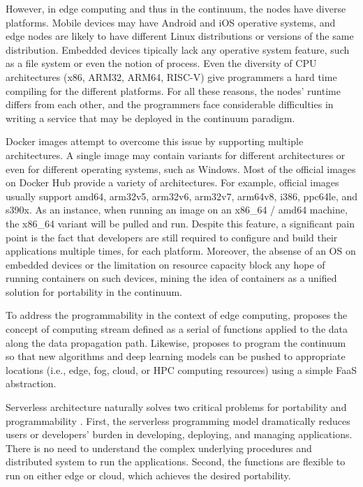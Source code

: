 \documentclass{ieeeaccess}
\begin{document}
However, in edge computing and thus in the continuum, the nodes have diverse platforms. Mobile devices may have Android and iOS operative systems, and edge nodes are likely to have different Linux distributions or versions of the same distribution. Embedded devices tipically lack any operative system feature, such as a file system or even the notion of process. Even the diversity of CPU architectures (x86, ARM32, ARM64, RISC-V) give programmers a hard time compiling for the different platforms. For all these reasons, the nodes' runtime differs from each other, and the programmers face considerable difficulties in writing a service that may be deployed in the continuum paradigm.

Docker images attempt to overcome this issue by supporting multiple architectures. A single image may contain variants for different architectures or even for different operating systems, such as Windows. Most of the official images on Docker Hub \cite{docker-hub} provide a variety of architectures. For example, official images usually support amd64, arm32v5, arm32v6, arm32v7, arm64v8, i386, ppc64le, and s390x. As an instance, when running an image on an x86\_64 / amd64 machine, the x86\_64 variant will be pulled and run. Despite this feature, a significant pain point is the fact that developers are still required to configure and build their applications multiple times, for each platform. Moreover, the absense of an OS on embedded devices or the limitation on resource capacity block any hope of running containers on such devices, mining the idea of containers as a unified solution for portability in the continuum.

To address the programmability in the context of edge computing, \cite{edge-computing-vision-challenges} proposes the concept of computing stream defined as a serial of functions applied to the data along the data propagation path. Likewise, \cite{harnessing-continuum} proposes to program the continuum so that new algorithms and deep learning models can be pushed to appropriate locations (i.e., edge, fog, cloud, or HPC computing resources) using a simple FaaS abstraction.

Serverless architecture naturally solves two critical problems for portability and programmability \cite{lavea}. First, the serverless programming model dramatically reduces users or developers' burden in developing, deploying, and managing applications. There is no need to understand the complex underlying procedures and distributed system to run the applications. Second, the functions are flexible to run on either edge or cloud, which achieves the desired portability.
\end{document}

